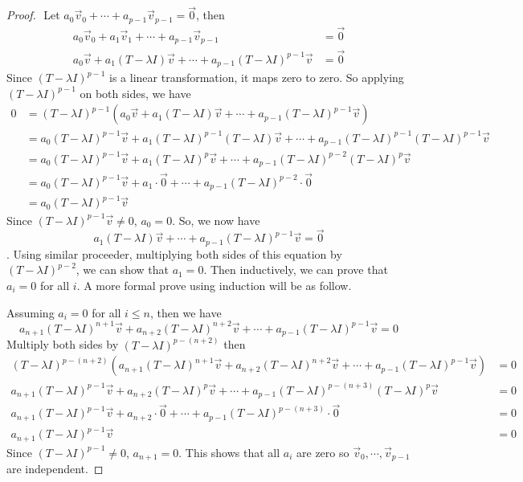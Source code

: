 \documentclass{article}
\begin{document}
\begin{proof}
$ $\newline
Let $a_0 \vec{v}_0 + \cdots + a_{p-1} \vec{v}_{p-1} =\vec{0}$, then 
\begin{align*}
a_0 \vec{v}_0 + a_1 \vec{v}_1+ \cdots + a_{p-1} \vec{v}_{p-1} &= \vec{0} \\
a_0 \vec{v} + a_1 (T-\lambda I) \vec{v} + \cdots + a_{p-1} (T-\lambda I)^{p-1} \vec{v} &= \vec{0}
\end{align*}
Since $(T-\lambda I)^{p-1}$ is a linear transformation, it maps zero to zero. So applying $(T-\lambda I)^{p-1}$ on both sides, we have
\begin{align*}
0 &= (T-\lambda I)^{p-1}(a_0 \vec{v} + a_1 (T-\lambda I) \vec{v} + \cdots + a_{p-1} (T-\lambda I)^{p-1} \vec{v}) \\
&= a_0 (T-\lambda I)^{p-1} \vec{v} + a_1(T-\lambda I)^{p-1} (T-\lambda I) \vec{v} + \cdots + a_{p-1} (T-\lambda I)^{p-1}(T-\lambda I)^{p-1} \vec{v}\\
&= a_0 (T-\lambda I)^{p-1} \vec{v} + a_1(T-\lambda I)^{p} \vec{v} + \cdots + a_{p-1} (T-\lambda I)^{p-2}(T-\lambda I)^{p} \vec{v}\\
&= a_0 (T-\lambda I)^{p-1} \vec{v} + a_1 \cdot \vec{0} + \cdots + a_{p-1} (T-\lambda I)^{p-2} \cdot \vec{0}\\
&= a_0 (T-\lambda I)^{p-1} \vec{v}
\end{align*}
Since $(T-\lambda I)^{p-1}\vec{v} \ne 0 $, $a_0 = 0$. So, we now have $$a_1 (T-\lambda I) \vec{v} + \cdots + a_{p-1} (T-\lambda I)^{p-1} \vec{v} = \vec{0} $$. Using similar proceeder, multiplying both sides of this equation by $(T-\lambda I)^{p-2}$, we can show that $a_1 =0$. Then inductively, we can prove that $a_i = 0$ for all $i$. A more formal prove using induction will be as follow.

Assuming $a_i = 0$ for all $i \le n$, then we have 
$$a_{n+1}(T-\lambda I)^{n+1}\vec{v} + a_{n+2}(T-\lambda I)^{n+2}\vec{v} + \cdots + a_{p-1}(T-\lambda I)^{p-1} \vec{v}= 0$$
Multiply both sides by $(T-\lambda I) ^{p-(n+2)}$ then 
\begin{align*}
(T-\lambda I) ^{p-(n+2)}(a_{n+1}(T-\lambda I)^{n+1}\vec{v} + a_{n+2}(T-\lambda I)^{n+2}\vec{v} + \cdots + a_{p-1}(T-\lambda I)^{p-1}\vec{v}) &= 0 \\
a_{n+1}(T-\lambda I)^{p-1} \vec{v}+ a_{n+2}(T-\lambda I)^{p}\vec{v} + \cdots + a_{p-1}(T-\lambda I)^{p-(n+3)}(T-\lambda I)^{p}\vec{v} &=0 \\
a_{n+1}(T-\lambda I)^{p-1} \vec{v}+ a_{n+2}\cdot \vec{0} + \cdots + a_{p-1}(T-\lambda I)^{p-(n+3)}\cdot \vec{0}&=0 \\
a_{n+1}(T-\lambda I)^{p-1} \vec{v} &= 0
\end{align*}
Since $(T-\lambda I)^{p-1} \ne 0$, $a_{n+1}=0$. This shows that all $a_i$ are zero so $\vec{v}_0, \cdots, \vec{v}_{p-1}$ are independent. 
\bigskip


\end{proof}
\end{document}
